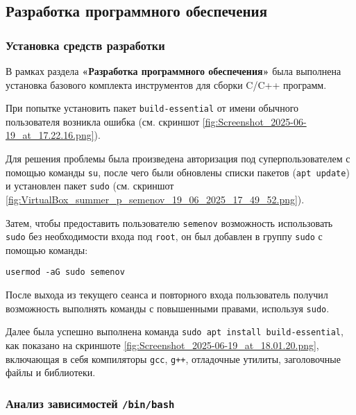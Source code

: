 \subsection{Разработка программного обеспечения}

\subsubsection*{Установка средств разработки}

В рамках раздела \textbf{«Разработка программного обеспечения»} была выполнена установка базового комплекта инструментов для сборки C/C++ программ.

При попытке установить пакет \texttt{build-essential} от имени обычного пользователя возникла ошибка (см. скриншот \ref{fig:Screenshot_2025-06-19_at_17.22.16.png}). 


Для решения проблемы была произведена авторизация под суперпользователем с помощью команды \texttt{su}, после чего были обновлены списки пакетов (\texttt{apt update}) и установлен пакет \texttt{sudo} (см. скриншот \ref{fig:VirtualBox_summer_p_semenov_19_06_2025_17_49_52.png}). 


Затем, чтобы предоставить пользователю \texttt{semenov} возможность использовать \texttt{sudo} без необходимости входа под \texttt{root}, он был добавлен в группу \texttt{sudo} с помощью команды:

\begin{verbatim}
usermod -aG sudo semenov
\end{verbatim}

После выхода из текущего сеанса и повторного входа пользователь получил возможность выполнять команды с повышенными правами, используя \texttt{sudo}.

Далее была успешно выполнена команда \texttt{sudo apt install build-essential}, как показано на скриншоте \ref{fig:Screenshot_2025-06-19_at_18.01.20.png}, включающая в себя компиляторы \texttt{gcc}, \texttt{g++}, отладочные утилиты, заголовочные файлы и библиотеки.


\subsubsection*{Анализ зависимостей \texttt{/bin/bash}}

